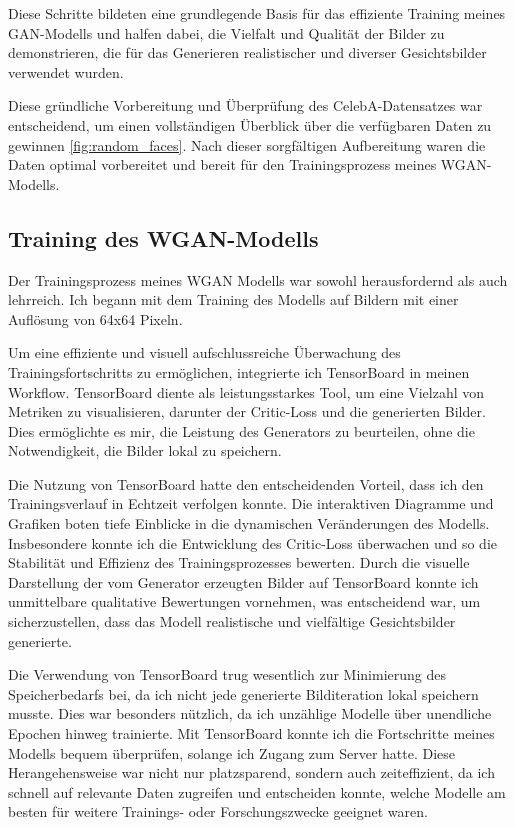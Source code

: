 \documentclass[a4paper, 12pt]{article}
\begin{document}
Diese Schritte bildeten eine grundlegende Basis für das effiziente Training meines GAN-Modells und halfen dabei, die Vielfalt und Qualität der Bilder zu demonstrieren, die für das Generieren realistischer und diverser Gesichtsbilder verwendet wurden.


Diese gründliche Vorbereitung und Überprüfung des CelebA-Datensatzes war entscheidend, um einen vollständigen Überblick über die verfügbaren Daten zu gewinnen \ref{fig:random_faces}. Nach dieser sorgfältigen Aufbereitung waren die Daten optimal vorbereitet und bereit für den Trainingsprozess meines WGAN-Modells.


\subsection{Training des WGAN-Modells}
Der Trainingsprozess meines WGAN Modells war sowohl herausfordernd als auch lehrreich. Ich begann mit dem Training des Modells auf Bildern mit einer Auflösung von 64x64 Pixeln.

Um eine effiziente und visuell aufschlussreiche Überwachung des Trainingsfortschritts zu ermöglichen, integrierte ich TensorBoard in meinen Workflow. TensorBoard diente als leistungsstarkes Tool, um eine Vielzahl von Metriken zu visualisieren, darunter der Critic-Loss und die generierten Bilder. Dies ermöglichte es mir, die Leistung des Generators zu beurteilen, ohne die Notwendigkeit, die Bilder lokal zu speichern.

Die Nutzung von TensorBoard hatte den entscheidenden Vorteil, dass ich den Trainingsverlauf in Echtzeit verfolgen konnte. Die interaktiven Diagramme und Grafiken boten tiefe Einblicke in die dynamischen Veränderungen des Modells. Insbesondere konnte ich die Entwicklung des Critic-Loss überwachen und so die Stabilität und Effizienz des Trainingsprozesses bewerten. Durch die visuelle Darstellung der vom Generator erzeugten Bilder auf TensorBoard konnte ich unmittelbare qualitative Bewertungen vornehmen, was entscheidend war, um sicherzustellen, dass das Modell realistische und vielfältige Gesichtsbilder generierte.

Die Verwendung von TensorBoard trug wesentlich zur Minimierung des Speicherbedarfs bei, da ich nicht jede generierte Bilditeration lokal speichern musste. Dies war besonders nützlich, da ich unzählige Modelle über unendliche Epochen hinweg trainierte. Mit TensorBoard konnte ich die Fortschritte meines Modells bequem überprüfen, solange ich Zugang zum Server hatte. Diese Herangehensweise war nicht nur platzsparend, sondern auch zeiteffizient, da ich schnell auf relevante Daten zugreifen und entscheiden konnte, welche Modelle am besten für weitere Trainings- oder Forschungszwecke geeignet waren.
\end{document}
